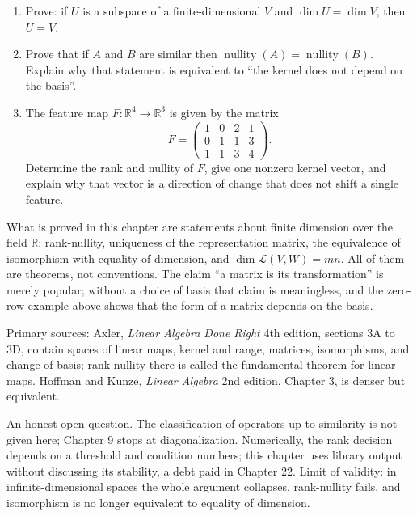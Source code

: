 \begin{latihan}
\begin{enumerate}
  \item Prove: if $U$ is a subspace of a finite-dimensional $V$ and $\dim U=\dim V$, then $U=V$.

  \item Prove that if $A$ and $B$ are similar then $\operatorname{nullity}(A)
        =\operatorname{nullity}(B)$. Explain why that statement is equivalent to
        ``the kernel does not depend on the basis''.

  \item The feature map $F\colon\mathbb{R}^{4}\to\mathbb{R}^{3}$ is given by the matrix
        \[
          F=\begin{pmatrix}1&0&2&1\\ 0&1&1&3\\ 1&1&3&4\end{pmatrix}.
        \]
        Determine the rank and nullity of $F$, give one nonzero kernel vector, and explain why
        that vector is a direction of change that does not shift a single feature.
\end{enumerate}
\end{latihan}

\begin{untukpeneliti}
What is proved in this chapter are statements about finite dimension over the field $\mathbb{R}$:
rank-nullity, uniqueness of the representation matrix, the equivalence of isomorphism with equality of
dimension,
and $\dim\mathcal{L}(V,W)=mn$. All of them are theorems, not conventions. The claim ``a matrix is its transformation'' is merely popular; without a choice of basis that claim is meaningless, and the zero-row
example
above shows that the form of a matrix depends on the basis.

Primary sources: Axler, \emph{Linear Algebra Done Right} 4th edition, sections 3A to 3D,
contain
spaces of linear maps, kernel and range, matrices, isomorphisms, and change of basis;
rank-nullity
there is called the fundamental theorem for linear maps. Hoffman and Kunze, \emph{Linear
Algebra}
2nd edition, Chapter 3, is denser but equivalent.

An honest open question. The classification of operators up to similarity is not given
here; Chapter 9 stops at diagonalization. Numerically, the rank decision depends on a
threshold and
condition numbers; this chapter uses library output without discussing its stability, a debt paid
in Chapter 22. Limit of validity: in infinite-dimensional spaces the whole argument collapses,
rank-nullity
fails, and isomorphism is no longer equivalent to equality of dimension.
\end{untukpeneliti}

